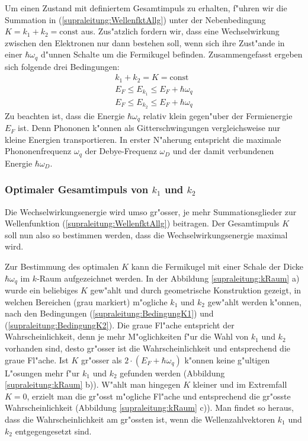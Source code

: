 \begin{refsection}
Um einen Zustand mit definiertem Gesamtimpuls zu erhalten, f"uhren wir die Summation in
(\ref{supraleitung:WellenfktAllg}) unter der Nebenbedingung $K=k_1+k_2=\text{const}$ aus.
Zus"atzlich fordern wir, dass eine Wechselwirkung zwischen den Elektronen nur dann bestehen soll,
wenn sich ihre Zust"ande in einer $\hbar\omega_q$ d"unnen Schalte um die Fermikugel befinden.
Zusammengefasst ergeben sich folgende drei Bedingungen:
\begin{gather}
k_1+k_2=K=\text{const}
\label{supraleitung:BedingungConst}\\
E_F\le E_{k_1}\le E_F+\hbar\omega_q
\label{supraleitung:BedingungK1}\\
E_F\le E_{k_2}\le E_F+\hbar\omega_q
\label{supraleitung:BedingungK2}
\end{gather}
Zu beachten ist, dass die Energie $\hbar \omega_q$ relativ klein gegen"uber der Fermienergie $E_F$
ist. Denn Phononen k"onnen als Gitterschwingungen vergleichsweise
nur kleine Energien transportieren.
In erster N"aherung entspricht die maximale Phononenfrequenz $\omega_q$ der
 Debye-Frequenz $\omega_D$ und der damit verbundenen
Energie $\hbar \omega_D$.

\subsubsection{Optimaler Gesamtimpuls von $k_1$ und $k_2$}

Die Wechselwirkungsenergie wird umso gr"osser, je mehr Summationsglieder zur Wellenfunktion
(\ref{supraleitung:WellenfktAllg}) beitragen.
Der Gesamtimpuls $K$ soll nun also so bestimmen werden, dass die Wechselwirkungsenergie maximal wird.

Zur Bestimmung des optimalen $K$ kann die Fermikugel mit einer Schale der Dicke
$\hbar\omega_q$ im $k$-Raum aufgezeichnet werden.
In der Abbildung \ref{supraleitung:kRaum} a) wurde ein beliebiges $K$ gew"ahlt und durch
geometrische Konstruktion gezeigt, in welchen Bereichen (grau markiert) m"ogliche $k_1$ und $k_2$
gew"ahlt werden k"onnen, nach den Bedingungen (\ref{supraleitung:BedingungK1}) und
(\ref{supraleitung:BedingungK2}).
Die graue Fl"ache entspricht der Wahrscheinlichkeit, denn je mehr M"oglichkeiten f"ur die Wahl
von $k_1$ und $k_2$ vorhanden sind, desto gr"osser ist die Wahrscheinlichkeit und entsprechend
die graue Fl"ache.
Ist $K$ gr"osser als $2\cdot(E_F+\hbar\omega_q)$ k"onnen keine g"ultigen L"osungen mehr
f"ur $k_1$ und $k_2$ gefunden werden (Abbildung \ref{supraleitung:kRaum} b)).
W"ahlt man hingegen $K$ kleiner und im Extremfall $K=0$, erzielt man die gr"osst m"ogliche
Fl"ache und entsprechend die gr"osste Wahrscheinlichkeit (Abbildung \ref{supraleitung:kRaum} c)).
Man findet so heraus, dass die Wahrscheinlichkeit am gr"ossten ist, wenn die
Wellenzahlvektoren $k_1$ und $k_2$ entgegengesetzt sind.


\end{refsection}
